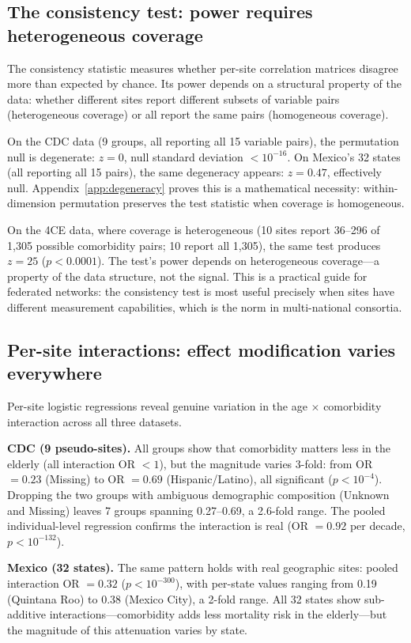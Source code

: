 \documentclass{article}
\begin{document}
\subsection{The consistency test: power requires heterogeneous coverage}

The consistency statistic measures whether per-site correlation matrices
disagree more than expected by chance.  Its power depends on a structural
property of the data: whether different sites report different subsets of
variable pairs (heterogeneous coverage) or all report the same pairs
(homogeneous coverage).

On the CDC data (9 groups, all reporting all 15 variable pairs), the
permutation null is degenerate: $z = 0$, null standard deviation
$< 10^{-16}$.  On Mexico's 32 states (all reporting all 15 pairs), the
same degeneracy appears: $z = 0.47$, effectively null.
Appendix~\ref{app:degeneracy} proves this is a mathematical necessity:
within-dimension permutation preserves the test statistic when coverage is
homogeneous.

On the 4CE data, where coverage is heterogeneous (10 sites report
36--296 of 1,305 possible comorbidity pairs; 10 report all 1,305), the
same test produces $z = 25$ ($p < 0.0001$).  The test's power depends on
heterogeneous coverage---a property of the data structure, not the signal.
This is a practical guide for federated networks: the consistency test is
most useful precisely when sites have different measurement capabilities,
which is the norm in multi-national consortia.


\subsection{Per-site interactions: effect modification varies everywhere}

Per-site logistic regressions reveal genuine variation in the
age $\times$ comorbidity interaction across all three datasets.

\textbf{CDC (9 pseudo-sites).}  All groups show that comorbidity matters
less in the elderly (all interaction OR $< 1$), but the magnitude varies
3-fold: from OR $= 0.23$ (Missing) to OR $= 0.69$ (Hispanic/Latino), all
significant ($p < 10^{-4}$).  Dropping the two groups with ambiguous
demographic composition (Unknown and Missing) leaves 7 groups spanning
0.27--0.69, a 2.6-fold range.  The pooled individual-level regression
confirms the interaction is real (OR $= 0.92$ per decade,
$p < 10^{-132}$).

\textbf{Mexico (32 states).}  The same pattern holds with real geographic
sites: pooled interaction OR $= 0.32$ ($p < 10^{-300}$), with per-state
values ranging from 0.19 (Quintana Roo) to 0.38 (Mexico City), a 2-fold
range.  All 32 states show sub-additive interactions---comorbidity adds
less mortality risk in the elderly---but the magnitude of this attenuation
varies by state.
\end{document}
